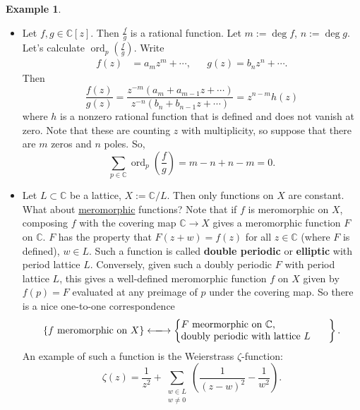 \documentclass[12pt]{article}
\newcommand{\cx}{\mathbb{C}}
\newcommand\setb[1]{\left \{ #1 \right \}}
\theoremstyle{definition}
\newtheorem{example}[theorem]{Example}
\theoremstyle{remark}
\DeclareMathOperator\ord{ord}
\begin{document}
\begin{example}
    \noindent
    \begin{itemize}
        \item Let $f , g \in \cx[z]$. Then $\frac{f}{g}$ is a rational function. Let $m := \deg f$, $n := \deg g$. Let's calculate $\ord_p \left( \frac{f}{g} \right)$. Write 
        \begin{align}
            f(z) & = a_m z^m + \dotsb, && g(z) = b_n z^n + \dotsb.
        \end{align}
        Then 
        \begin{equation}
            \frac{f(z)}{g(z)} = \frac{z^{-m} \left( a_m + a_{m-1}z + \dotsb \right)}{z^{-n} \left( b_n + b_{n-1}z + \dotsb \right)} = z^{n - m} h(z)
        \end{equation}
        where $h$ is a nonzero rational function that is defined and does not vanish at zero. Note that these are counting $z$ with multiplicity, so suppose that there are $m$ zeros and $n$ poles. So, 
        \begin{equation}
            \sum\limits_{p \in \cx} \ord_p \left( \frac{f}{g} \right) = m - n + n - m = 0.
        \end{equation}
        \item Let $L \subset \cx$ be a lattice, $X := \cx / L$. Then only functions on $X$ are constant. What about \underline{meromorphic} functions? Note that if $f$ is meromorphic on $X$, composing $f$ with the covering map $\cx \to X$ gives a meromorphic function $F$ on $\cx$. $F$ has the property that $F(z+w) = f(z)$ for all $z \in \cx$ (where $F$ is defined), $w \in L$. Such a function is called \textbf{double periodic} or \textbf{elliptic} with period lattice $L$. Conversely, given such a doubly periodic $F$ with period lattice $L$, this gives a well-defined meromorphic function $f$ on $X$ given by $f(p) = F$ evaluated at any preimage of $p$ under the covering map. So there is a nice one-to-one correspondence
        \begin{equation}
            \setb{ \text{$f$ meromorphic on $X$} } \xlongleftrightarrow{} \left\{ \parbox{15em}{$F$ meormorphic on $\cx$, \\ doubly periodic with lattice $L$} \right\}.
        \end{equation}
        An example of such a function is the Weierstrass $\zeta$-function:
        \begin{equation}
            \zeta(z) = \frac{1}{z^2} + \sum\limits_{
            \substack{
                w \in L \\
                w \neq 0
                }
            }
            \left( \frac{1}{(z-w)^2} - \frac{1}{w^2} \right).
        \end{equation}
    \end{itemize}
\end{example}
\end{document}
